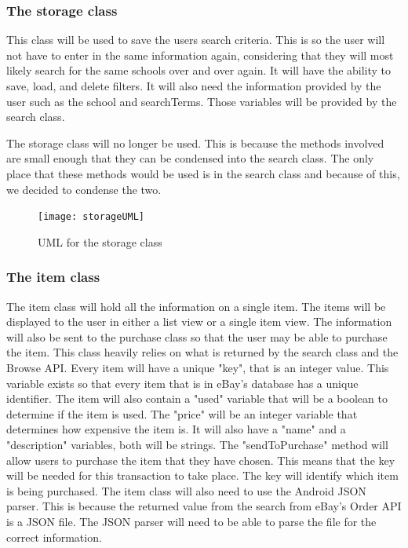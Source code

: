 \documentclass[journal,compsoc, 10pt, draftclsnofoot, onecolumn]{IEEEtran}
\begin{document}
\subsubsection*{The storage class}
This class will be used to save the users search criteria. This is so the user 
will not have to enter in the same information again, considering that they 
will most likely search for the same schools over and over again. It will have 
the ability to save, load, and delete filters. It will also need the information 
provided by the user such as the school and searchTerms. Those variables will be 
provided by the search class. \newline

The storage class will no longer be used. This is because the methods involved are 
small enough that they can be condensed into the search class. The only place 
that these methods would be used is in the search class and because of this, we 
decided to condense the two. 

\begin{figure}[h]
\centering
\caption{UML for the storage class}
\texttt{[image: storageUML]}
\end{figure}
\FloatBarrier

\subsubsection*{The item class}
The item class will hold all the information on a single item. The items will be 
displayed to the user in either a list view or a single item view. The information 
will also be sent to the purchase class so that the user may be able to purchase 
the item. This class heavily relies on what is returned by the search class and 
the Browse API. Every item will have a unique "key", that is an integer value. This 
variable exists so that every item that is in eBay's database has a unique 
identifier. The item will also contain a "used" variable that will be a boolean 
to determine if the item is used. The "price" will be an integer variable that 
determines how expensive the item is. It will also have a "name" and a 
"description" variables,  both will be strings. The "sendToPurchase" method will 
allow users to purchase the item that they have chosen. This means that the key 
will be needed for this transaction to take place. The key will identify which 
item is being purchased. The item class will also need to use the Android JSON 
parser. This is because the returned value from the search from eBay's Order 
API is a JSON file. The JSON parser will need to be able to parse the file for the
correct information.
\end{document}
